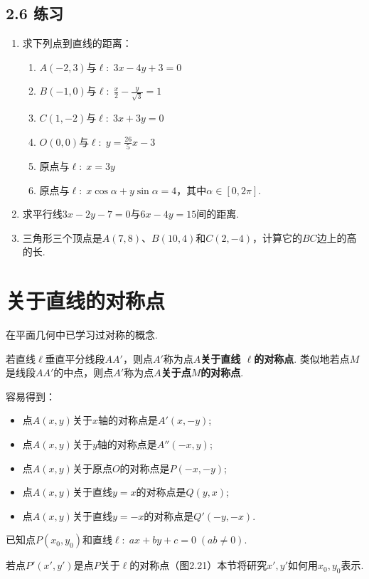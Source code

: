 \subsection*{2.6 练习}
\begin{enumerate}
\item 求下列点到直线的距离：
\begin{enumerate}[(1)]
\item $A(-2,3)$与$\ell:\; 3x-4y+3=0$
\item $B(-1,0)$与$\ell:\; \frac{x}{2}-\frac{y}{\sqrt{3}}=1$
\item $C(1,-2)$与$\ell:\; 3x+3y=0$
\item $O(0,0)$与$\ell:\; y=\frac{26}{5}x-3$
\item 原点与$\ell:\; x=3y$    
\item 原点与$\ell:\; x\cos\alpha+y\sin\alpha=4$，其中$\alpha\in[0,2\pi]$.
\end{enumerate}

\item 求平行线$3x-2y-7=0$与$6x-4y=15$间的距离.
\item 三角形三个顶点是$A(7,8)$、$B(10,4)$和$C(2,-4)$，计算它的$BC$边上的高的长.
\end{enumerate}



\section{关于直线的对称点}
在平面几何中已学习过对称的概念.

若直线$\ell$垂直平分线段$AA'$，则点$A'$称为点$A$\textbf{关于直线
$\ell$的对称点}. 类似地若点$M$是线段$AA'$的中点，则点$A'$称为点$A$\textbf{关于点$M$的对称点}.

容易得到：
\begin{itemize}
\item 点$A(x,y)$关于$x$轴的对称点是$A'(x,-y)$;
\item 点$A(x,y)$关于$y$轴的对称点是$A''(-x,y)$;
\item 点$A(x,y)$关于原点$O$的对称点是$P(-x,-y)$;
\item 点$A(x,y)$关于直线$y=x$的对称点是$Q(y,x)$;
\item 点$A(x,y)$关于直线$y=-x$的对称点是$Q'(-y,-x)$.
\end{itemize}

已知点$P(x_0,y_0)$和直线$\ell:\; ax+by+c=0\; (ab\ne 0)$.

若点$P'(x',y')$是点$P$关于$\ell$的对称点（图2.21）本节将研究$x',y'$如何用$x_0,y_0$表示.

